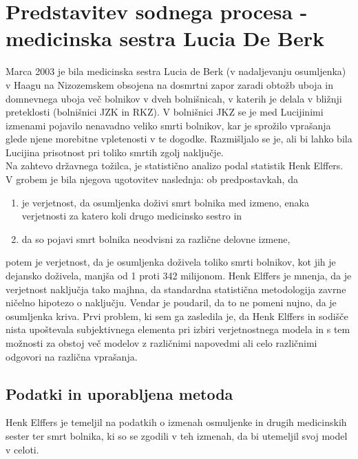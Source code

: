 \documentclass[mat1, tisk]{fmfdelo}
\theoremstyle{definition} %
\theoremstyle{trditev} %
\theoremstyle{izrek}
\begin{document}
\section{Predstavitev sodnega procesa - medicinska sestra Lucia De Berk}
Marca 2003 je bila medicinska sestra Lucia de Berk (v nadaljevanju osumljenka) v Haagu na Nizozemskem obsojena na dosmrtni zapor zaradi obtožb 
uboja in domnevnega uboja več bolnikov v dveh bolnišnicah, v katerih je delala v bližnji preteklosti (bolnišnici JZK in RKZ). V bolnišnici JKZ 
se je med Lucijinimi izmenami pojavilo nenavadno veliko smrti bolnikov, kar je sprožilo vprašanja glede njene morebitne vpletenosti v te dogodke. 
Razmišljalo se je, ali bi lahko bila Lucijina prisotnost pri toliko smrtih zgolj naključje.\\
Na zahtevo državnega tožilca, je statistično analizo podal statistik Henk Elffers. V grobem je bila njegova ugotovitev naslednja: ob predpostavkah, da
\begin{enumerate}
    \item je verjetnost, da osumljenka doživi smrt bolnika med izmeno, enaka verjetnosti za katero koli drugo medicinsko sestro in
    \item da so pojavi smrt bolnika neodvisni za različne delovne izmene,
\end{enumerate}
potem je verjetnost, da je osumljenka doživela toliko smrti bolnikov, kot jih je dejansko doživela, manjša od 1 proti 342 milijonom. Henk Elffers je mnenja, 
da je verjetnost naključja tako majhna, da standardna statistična metodologija zavrne ničelno hipotezo o naključju. Vendar je poudaril, da 
to ne pomeni nujno, da je osumljenka kriva. Prvi problem, ki sem ga zasledila je, da Henk Elffers in sodišče nista upoštevala subjektivnega 
elementa pri izbiri verjetnostnega modela in s tem možnosti za obstoj več modelov z različnimi napovedmi ali celo različnimi odgovori 
na različna vprašanja. 

\subsection{Podatki in uporabljena metoda}
Henk Elffers je temeljil na podatkih o izmenah osmuljenke in drugih medicinskih sester ter smrt bolnika, ki so se zgodili v teh izmenah, da bi 
utemeljil svoj model v celoti.
\end{document}
